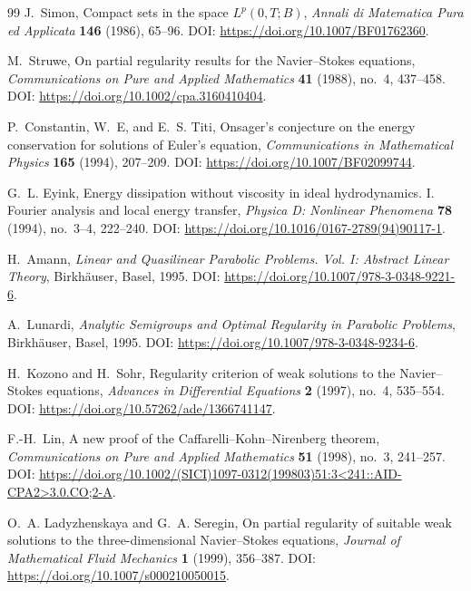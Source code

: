 \documentclass[11pt]{article}
\numberwithin{equation}{section}
\theoremstyle{plain}
\theoremstyle{definition}
\theoremstyle{remark}
\begin{document}
\begin{thebibliography}{99}
J.~Simon,
\newblock Compact sets in the space \(L^p(0,T;B)\),
\newblock \emph{Annali di Matematica Pura ed Applicata} \textbf{146} (1986), 65--96.
\newblock DOI: \url{https://doi.org/10.1007/BF01762360}.

M.~Struwe,
\newblock On partial regularity results for the Navier--Stokes equations,
\newblock \emph{Communications on Pure and Applied Mathematics} \textbf{41} (1988), no.~4, 437--458.
\newblock DOI: \url{https://doi.org/10.1002/cpa.3160410404}.

P.~Constantin, W.~E, and E.~S. Titi,
\newblock Onsager's conjecture on the energy conservation for solutions of Euler's equation,
\newblock \emph{Communications in Mathematical Physics} \textbf{165} (1994), 207--209.
\newblock DOI: \url{https://doi.org/10.1007/BF02099744}.

G.~L. Eyink,
\newblock Energy dissipation without viscosity in ideal hydrodynamics. I. Fourier analysis and local energy transfer,
\newblock \emph{Physica D: Nonlinear Phenomena} \textbf{78} (1994), no.~3--4, 222--240.
\newblock DOI: \url{https://doi.org/10.1016/0167-2789(94)90117-1}.


H.~Amann,
\newblock \emph{Linear and Quasilinear Parabolic Problems. Vol. I: Abstract Linear Theory},
\newblock Birkh\"auser, Basel, 1995.
\newblock DOI: \url{https://doi.org/10.1007/978-3-0348-9221-6}.

A.~Lunardi,
\newblock \emph{Analytic Semigroups and Optimal Regularity in Parabolic Problems},
\newblock Birkh\"auser, Basel, 1995.
\newblock DOI: \url{https://doi.org/10.1007/978-3-0348-9234-6}.

H.~Kozono and H.~Sohr,
\newblock Regularity criterion of weak solutions to the Navier--Stokes equations,
\newblock \emph{Advances in Differential Equations} \textbf{2} (1997), no.~4, 535--554.
\newblock DOI: \url{https://doi.org/10.57262/ade/1366741147}.

F.-H.~Lin,
\newblock A new proof of the Caffarelli--Kohn--Nirenberg theorem,
\newblock \emph{Communications on Pure and Applied Mathematics} \textbf{51} (1998), no.~3, 241--257.
\newblock DOI: \url{https://doi.org/10.1002/(SICI)1097-0312(199803)51:3<241::AID-CPA2>3.0.CO;2-A}.

O.~A. Ladyzhenskaya and G.~A. Seregin,
\newblock On partial regularity of suitable weak solutions to the three-dimensional Navier--Stokes equations,
\newblock \emph{Journal of Mathematical Fluid Mechanics} \textbf{1} (1999), 356--387.
\newblock DOI: \url{https://doi.org/10.1007/s000210050015}.


\end{thebibliography}
\end{document}
